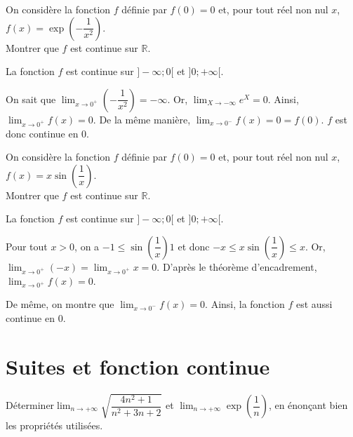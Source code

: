 \documentclass[11pt,fleqn, openany]{book} %
\begin{document}
\begin{exercise}[topic=cont01]On considère la fonction $f$ définie par $f(0)=0$ et, pour tout réel non nul $x$, $f(x)=\exp\left(-\dfrac{1}{x^2}\right)$. \\ Montrer que $f$ est continue sur $\mathbb{R}$.\end{exercise}

\begin{solution}La fonction $f$ est continue sur $]-\infty ;0[$ et $]0;+\infty[$.

On sait que $\displaystyle\lim_{x\to 0^+}\left(-\dfrac{1}{x^2}\right)=-\infty$. Or, $\displaystyle \lim_{X \to -\infty}e^X=0$. Ainsi, $\displaystyle\lim_{x\to 0^+}f(x)=0$. De la même manière, $\displaystyle\lim_{x\to 0^-}f(x)=0=f(0)$. $f$ est donc continue en 0.\end{solution}

\begin{exercise}[topic=cont01]
On considère la fonction $f$ définie par $f(0)=0$ et, pour tout réel non nul $x$, $f(x)=x \sin\left(\dfrac{1}{x}\right)$. \\ Montrer que $f$ est continue sur $\mathbb{R}$.\end{exercise}

\begin{solution}La fonction $f$ est continue sur $]-\infty ;0[$ et $]0;+\infty[$.

Pour tout $x>0$, on a $-1 \leqslant \sin\left(\dfrac{1}{x}\right) 1$ et donc $-x \leqslant x\sin\left(\dfrac{1}{x}\right) \leqslant x$. Or, $\displaystyle\lim_{x\to 0^+}(-x)=\displaystyle\lim_{x\to 0^+}x=0$. D'après le théorème d'encadrement, $\displaystyle\lim_{x\to 0^+}f(x)=0$.

De même, on montre que $\displaystyle\lim_{x\to 0^-}f(x)=0$. Ainsi, la fonction $f$ est aussi continue en 0.\end{solution}


\section*{Suites et fonction continue}

\begin{exercise}[topic=cont02]Déterminer$\displaystyle\lim_{n\to +\infty} \sqrt{\dfrac{4n^2+1}{n^2+3n+2}}$ et $\displaystyle\lim_{n\to +\infty} \exp\left( \dfrac{1}{n}\right)$, en énonçant bien les propriétés utilisées.\end{exercise}
\end{document}
